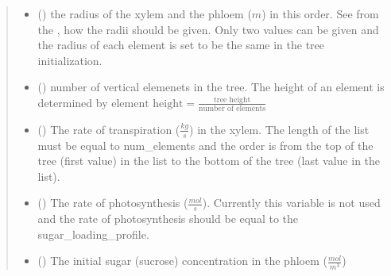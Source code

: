 \documentclass[letterpaper,10pt,english]{sphinxmanual}
\begin{document}
\begin{fulllineitems}
\begin{quote}
\begin{description}
\begin{itemize}
\item {} 
 (\sphinxstyleliteralemphasis{\sphinxupquote{{[}}}\sphinxstyleliteralemphasis{\sphinxupquote{{]} or }}) \textendash{} 
the radius of the xylem and the phloem (\(m\)) in this order.
See from the , how the radii should be given. Only two values can
be given and the radius of each element is set to be the same in the tree initialization.


\item {} 
 () \textendash{} number of vertical elemenets in the tree.
The height of an element is determined by
\(\text{element height} = \frac{\text{tree height}}{\text{number of elements}}\)

\item {} 
 (\sphinxstyleliteralemphasis{\sphinxupquote{{[}}}\sphinxstyleliteralemphasis{\sphinxupquote{{]} or }}) \textendash{} The rate of transpiration (\(\frac{kg}{s}\)) in the
xylem. The length of the list must be equal to num\_elements and the order is from the top of the tree
(first value) in the list to the bottom of the tree (last value in the list).

\item {} 
 (\sphinxstyleliteralemphasis{\sphinxupquote{{[}}}\sphinxstyleliteralemphasis{\sphinxupquote{{]}}}) \textendash{} The rate of photosynthesis (\(\frac{mol}{s}\)). Currently this
variable is not used and the rate of photosynthesis should be equal to the sugar\_loading\_profile.

\item {} 
 (\sphinxstyleliteralemphasis{\sphinxupquote{{[}}}\sphinxstyleliteralemphasis{\sphinxupquote{{]}}}\sphinxstyleliteralemphasis{\sphinxupquote{{]} or }}) \textendash{} The initial sugar (sucrose) concentration in the phloem
(\(\frac{mol}{m^3}\))


\end{itemize}
\end{description}
\end{quote}
\end{fulllineitems}
\end{document}
